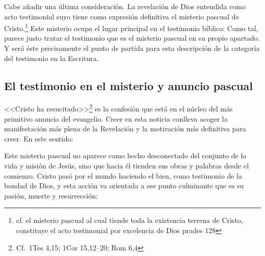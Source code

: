 Cabe añadir una última consideración. La revelación de Dios entendida como acto
testimonial suyo tiene como expresión definitiva el misterio pascual de
Cristo.\footnote{cf. el misterio pascual al cual tiende toda la existencia
  terrena de Cristo, constituye el acto testimonial por excelencia de Dios
  prades 128} Este misterio ocupa el lugar principal en el testimonio bíblico:
Como tal, parece justo tratar el testimonio que es el misterio pascual en su
propio apartado. Y será éste precisamente el punto de partida para esta
descripción de la categoría del testimonio en la Escritura.

\subsection{El testimonio en el misterio y anuncio pascual}

<<Cristo ha resucitado>>\footnote{Cf.~1Tes 4,15; 1Cor 15,12--20; Rom 6,4} es la
confesión que está en el núcleo del más primitivo anuncio del
evangelio.\autocite[Cf.][403]{ninot2009tf} Creer en esta noticia conlleva acoger la
manifestación más plena de la Revelación y la motivación más definitiva para
creer. En este sentido:

Este misterio pascual no aparece como hecho desconectado del conjunto de la vida
y misión de Jesús, sino que hacia él tienden sus obras y palabras desde el
comienzo. Cristo pasó por el mundo haciendo el bien, como testimonio de la
bondad de Dios, y esta acción va orientada a ese punto culminante que es su
pasión, muerte y resurrección; \autocite[127]{prades2015testimonio}

